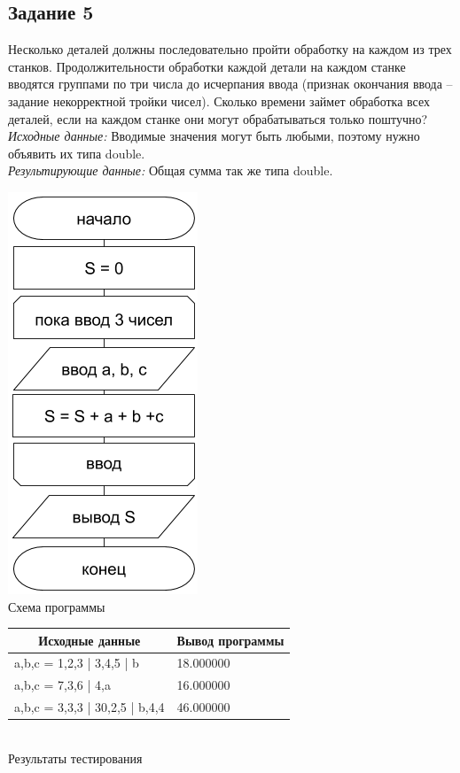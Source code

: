 \documentclass[a4paper,14pt]{extarticle}
\begin{document}
\subsection{Задание 5}
Несколько деталей должны последовательно пройти обработку на каждом из трех станков. Продолжительности обработки каждой детали на каждом станке вводятся группами по три числа до исчерпания ввода (признак окончания ввода – задание некорректной тройки чисел). Сколько времени займет обработка всех деталей, если на каждом станке они могут обрабатываться только поштучно?\\
\textit{Исходные данные:} Вводимые значения могут быть любыми, поэтому нужно объявить их типа double.\\
\textit{Результирующие данные:} Общая сумма так же типа double.\\
\begin{center}
\includegraphics[scale=0.6]{lab2-5.png}\\
Схема программы
\end{center}

\begin{center}
\begin{tabular}{|l|l|}
\hline
\multicolumn{1}{|c|}{Исходные данные}& \multicolumn{1}{|c|}{Вывод программы}\\
\hline
a,b,c = 1,2,3 | 3,4,5 | b & 18.000000\\
a,b,c = 7,3,6 | 4,a & 16.000000\\
a,b,c = 3,3,3 | 30,2,5 | b,4,4 & 46.000000\\
\hline
\end{tabular}\\
\vspace{0.3cm}
Результаты тестирования
\end{center}
\end{document}
